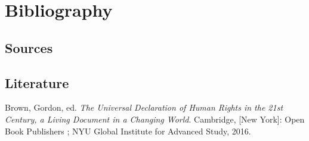 \documentclass[
  titlepage,
  openright,
  DIV=calc,
  toc=listof,
  listof=nochaptergap]{scrbook}
\newlength{\cslhangindent}
\newenvironment{CSLReferences}[2] %
 {\begin{list}{}{%
  \setlength{\itemindent}{0pt}
  \setlength{\leftmargin}{0pt}
  \setlength{\parsep}{0pt}
  \ifodd #1
   \setlength{\leftmargin}{\cslhangindent}
   \setlength{\itemindent}{-1\cslhangindent}
  \fi
  \setlength{\itemsep}{#2\baselineskip}}}
 {\end{list}}
\begin{document}

\listoffigures

\chapter{Bibliography}\label{bibliography}

\section{Sources}\label{sources}

\label{refs_sources}
\begin{CSLReferences}{1}{0}
\end{CSLReferences}

\clearpage

\section{Literature}\label{literature}

\label{refs_main}
\begin{CSLReferences}{1}{0}
Brown, Gordon, ed. \emph{The {Universal} {Declaration} of {Human}
{Rights} in the 21st Century, a Living Document in a Changing World}.
Cambridge, {[}New York{]}: Open Book Publishers ; NYU Global Institute
for Advanced Study, 2016.

\end{CSLReferences}

\backmatter
\end{document}
